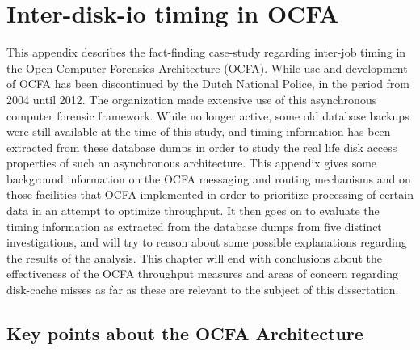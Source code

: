 \chapter{Inter-disk-io timing in OCFA}
This appendix describes the fact-finding case-study regarding inter-job timing in the Open Computer Forensics Architecture (OCFA). While use and development of OCFA has been discontinued by the Dutch National Police, in the period from 2004 until 2012. The organization made extensive use of this asynchronous computer forensic framework. While no longer active, some old database backups were still available at the time of this study, and timing information has been extracted from these database dumps in order to study the real life disk access properties of such an asynchronous architecture. This appendix gives some background information on the OCFA messaging and routing mechanisms and on those facilities that OCFA implemented in order to prioritize processing of certain data in an attempt to optimize throughput. 
It then goes on to evaluate the timing information as extracted from the database dumps from five distinct investigations, and will try to reason about some possible explanations regarding the results of the analysis. This chapter will end with conclusions about the effectiveness of the OCFA throughput measures and areas of concern regarding disk-cache misses as far as these are relevant to the subject of this dissertation.
\section{Key points about the OCFA Architecture}
